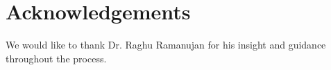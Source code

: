 
\section{Acknowledgements} 
\label{sec:ack} 
We would like to thank Dr. Raghu Ramanujan for his insight and guidance throughout the process.
